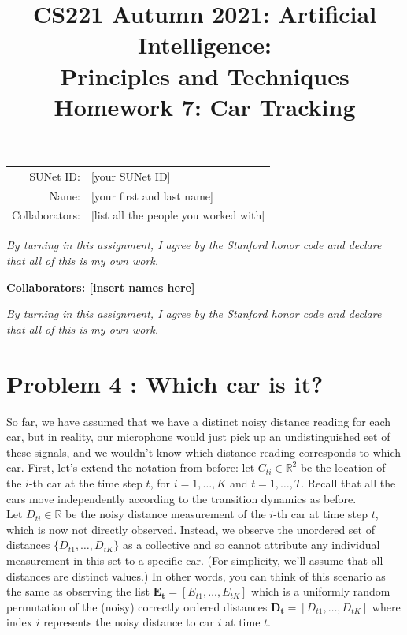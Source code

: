 \documentclass{article}
\title{\textbf{CS221 Autumn 2021: Artificial Intelligence:\\ Principles and Techniques} \\Homework 7: Car Tracking}
\date{}
\theoremstyle{case}
\theoremstyle{definition}
\begin{document}
	
\maketitle


\begin{center}
\begin{tabular}{rl}
SUNet ID: & [your SUNet ID] \\
Name: & [your first and last name] \\
Collaborators: & [list all the people you worked with]
\end{tabular}
\end{center}
\textit{By turning in this assignment, I agree by the Stanford honor code and declare
that all of this is my own work.} \\
\fontsize{12pt}{16pt}\selectfont

\textbf{Collaborators: [insert names here]}

\textit{By turning in this assignment, I agree by the Stanford honor code and declare that all of this is my own work.} \\
\section*{Problem 4 : Which car is it?}


So far, we have assumed that we have a distinct noisy distance reading for each car, but in
reality, our microphone would just pick up an undistinguished set of these signals, and we
wouldn't know which distance reading corresponds to which car.
First, let's extend the notation from before: let $C_{ti} \in \mathbb R^2$ be the location
of the $i$-th car at the time step $t$, for $i = 1, \dots, K$ and $t = 1, \dots, T$.
Recall that all the cars move independently according to the transition dynamics as before.\\


Let $D_{ti} \in \mathbb R$ be the noisy distance measurement of the $i$-th car at time step $t$,
which is now not directly observed.
Instead, we observe the unordered set of distances
$\{ D_{t1}, \dots, D_{tK} \}$ as a collective and so cannot attribute any individual measurement in this set to a specific car.  (For simplicity, we'll assume that all distances are distinct values.)
In other words, you can think of this scenario as the same as observing the list $\mathbf{E_t} = [E_{t1}, \dots, E_{tK}]$
which is a uniformly random permutation of the (noisy) correctly ordered distances $\mathbf{D_t} = [D_{t1}, \dots, D_{tK}]$ where index $i$ represents the noisy distance to car $i$ at time $t$.\\
\end{document}
